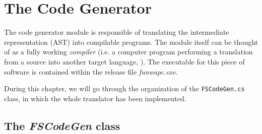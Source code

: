 
\chapter{\label{chapter4} The \fsharp Code Generator}

The code generator module is responsible of translating the \fwap intermediate representation (AST) into compilable \fsharp programs. The module itself can be thought of as a fully working \textit{compiler} (i.e. a computer program performing a translation from a source into another target language, \cite{dragon}). The executable for this piece of software is contained within the release file \textit{funwapc.exe}. 

During this chapter, we will go through the organization of the \texttt{FSCodeGen.cs} class, in which the whole translator has been implemented.


\section{The \textit{FSCodeGen} class}


